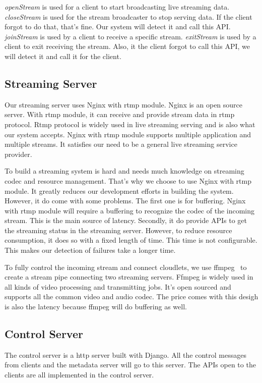 \documentclass[letterpaper,twocolumn,10pt]{article}
\begin{document}
\emph{openStream} is used for a client to start broadcasting live streaming data. \emph{closeStream} is used for the stream broadcaster to stop serving data. If the client forgot to do that, that's fine. Our system will detect it and call this API. \emph{joinStream} is used by a client to receive a specific stream. \emph{exitStream} is used by a client to exit receiving the stream. Also, it the client forgot to call this API, we will detect it and call it for the client. 

\subsection{Streaming Server}
Our streaming server uses Nginx with rtmp module. Nginx is an open source server. With rtmp module, it can receive and provide stream data in rtmp protocol. Rtmp protocol is widely used in live streaming serving and is also what our system accepts. Nginx with rtmp module supports multiple application and multiple streams. It satisfies our need to be a general live streaming service provider. 

To build a streaming system is hard and needs much knowledge on streaming codec and resource management. That's why we choose to use Nginx with rtmp module. It greatly reduces our development efforts in building the system. However, it do come with some problems. The first one is for buffering. Nginx with rtmp module will require a buffering to recognize the codec of the incoming stream. This is the main source of latency. Secondly, it do provide APIs to get the streaming status in the streaming server. However, to reduce resource consumption, it does so with a fixed length of time. This time is not configurable. This makes our detection of failures take a longer time.

To fully control the incoming stream and connect cloudlets, we use ffmpeg~\cite{tomar2006converting} to create a stream pipe connecting two streaming servers. Ffmpeg is widely used in all kinds of video processing and transmitting jobs. It's open sourced and supports all the common video and audio codec. The price comes with this desigh is also the latency because ffmpeg will do buffering as well.

\subsection{Control Server}
The control server is a http server built with Django. All the control messages from clients and the metadata server will go to this server. The APIs open to the clients are all implemented in the control server.
\end{document}
